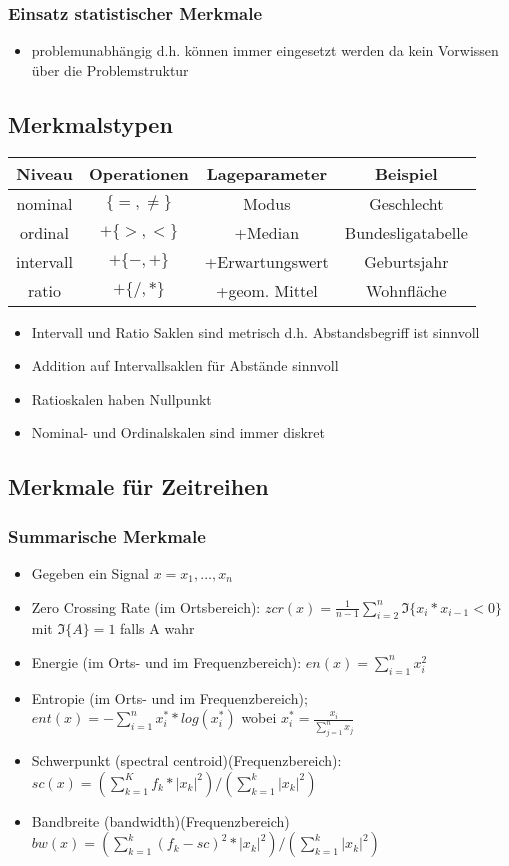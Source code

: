 \documentclass{article} %
\begin{document}
		\subsubsection{Einsatz statistischer Merkmale}
		\begin{itemize}
			\item problemunabhängig d.h. können immer eingesetzt werden da kein Vorwissen über die Problemstruktur 
		\end{itemize}
	\subsection{Merkmalstypen}
		\begin{center}
			\begin{tabular}{|c|c|c|c|}
				\hline Niveau & Operationen & Lageparameter & Beispiel \\ 
				\hline nominal & $\{=,\neq\}$ & Modus &  Geschlecht\\ 
				\hline ordinal & $+\{>,<\}$ & +Median  & Bundesligatabelle \\ 
				\hline intervall & $+\{-,+\}$ & +Erwartungswert &  Geburtsjahr\\ 
				\hline ratio & $+\{/,*\}$ & +geom. Mittel & Wohnfläche \\ 
				\hline 
			\end{tabular} 
		\end{center}
		\begin{itemize}
			\item Intervall und Ratio Saklen sind metrisch d.h. Abstandsbegriff ist sinnvoll
			\item Addition auf Intervallsaklen für Abstände sinnvoll
			\item Ratioskalen haben Nullpunkt
			\item Nominal- und Ordinalskalen sind immer diskret
		\end{itemize}
	\subsection{Merkmale für Zeitreihen}
		\subsubsection{Summarische Merkmale}
		\begin{itemize}
			\item Gegeben ein Signal $x = x_1,\dots,x_n$
			\item Zero Crossing Rate (im Ortsbereich): $zcr(x) = \frac{1}{n-1} \sum_{i=2}^{n} \mathfrak{I}\{x_i*x_{i-1} < 0\}$ mit $\mathfrak{I}\{A\} = 1$ falls A wahr
			\item Energie (im Orts- und im Frequenzbereich): $en(x) = \sum_{i=1}^{n} x_i^2$
			\item Entropie (im Orts- und im Frequenzbereich); $ent(x) = -\sum_{i=1}^{n} x_i^**log(x_i^*)$ wobei $x_i^* = \frac{x_i}{\sum_{j=1}^{n}x_j}$
			\item Schwerpunkt (spectral centroid)(Frequenzbereich): $sc(x) = (\sum_{k=1}^{K}f_k*|x_k|^2)/(\sum_{k=1}^{k}|x_k|^2)$
			\item Bandbreite (bandwidth)(Frequenzbereich) $bw(x) = (\sum_{k=1}^{k}(f_k-sc)^2*|x_k|^2)/(\sum_{k=1}^{k}|x_k|^2)$
		\end{itemize}
\end{document}
